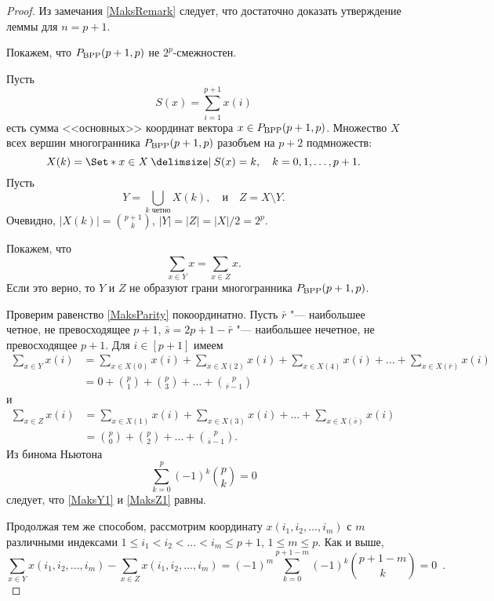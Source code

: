 \begin{proof}
Из замечания \ref{MaksRemark} следует, что достаточно доказать утверждение леммы для $n=p+1$.
	
Покажем, что $P_{\textup{BPP}}(p+1,p)$ не $2^p$-смежностен.
	
Пусть
$$
S(x) = \sum^{p+1}_{i = 1} x(i)
$$ 
есть сумма <<основных>> координат вектора $x\in P_{\textup{BPP}}(p+1,p)$.
Множество $X$ всех вершин многогранника $P_{\textup{BPP}}(p+1,p)$ разобъем на $p+2$ подмножеств:
$$
X(k) = \Set*{x\in X \given S(x) = k}, \quad k = 0,1,\ldots, p+1.
$$
Пусть
$$
Y = \bigcup_{\text{$k$ четно}} X(k), \quad \text{и} \quad
Z = X \setminus Y.
$$
Очевидно, $|X(k)| = \binom{p+1}{k}$, $|Y| = |Z| = |X|/2 = 2^p$.

Покажем, что
\begin{equation}
\label{MaksParity}
\sum_{x\in Y} x = \sum_{x\in Z} x.
\end{equation}
Если это верно, то $Y$ и $Z$ не образуют грани многогранника $P_{\textup{BPP}}(p+1,p)$.
	
Проверим равенство \eqref{MaksParity} покоординатно.
Пусть $\bar{r}$ "--- наибольшее четное, не превосходящее $p+1$, $\bar{s} = 2p+1 - \bar{r}$ "--- наибольшее нечетное, не превосходящее $p+1$.
Для $i \in [p+1]$ имеем
	\begin{equation}
	\label{MaksY1}
	\begin{aligned}
	\sum_{x\in Y} x(i) &= \sum_{x\in X(0)} x(i) + \sum_{x\in X(2)} x(i) + \sum_{x\in X(4)} x(i) + \ldots + \sum_{x\in X(\bar{r})} x(i) \\
	&= 0 + \binom{p}{1} + \binom{p}{3} + \ldots + \binom{p}{\bar{r}-1}
	\end{aligned}
	\end{equation}
	и
	\begin{equation}
	\label{MaksZ1}
	\begin{aligned}
	\sum_{x\in Z} x(i) &= \sum_{x\in X(1)} x(i) + \sum_{x\in X(3)} x(i) + \ldots + \sum_{x\in X(\bar{s})} x(i) \phantom{{} + \sum_{x\in X(0)} x(i)} \\
	&= \binom{p}{0} + \binom{p}{2} + \ldots + \binom{p}{\bar{s}-1}.
	\end{aligned}
	\end{equation}
	Из бинома Ньютона
	$$
	\sum^{p}_{k=0} (-1)^k \binom{p}{k} = 0
	$$
	следует, что \eqref{MaksY1} и \eqref{MaksZ1} равны.
	
	Продолжая тем же способом, рассмотрим координату $x(i_1, i_2, \ldots, i_m)$
	с $m$ различными индексами $1\le i_1 < i_2 < \ldots < i_m \le p+1$, $1\le m \le p$.
	Как и выше,
	\begin{equation*}
	\sum_{x\in Y} x(i_1, i_2, \ldots, i_m) - \sum_{x\in Z} x(i_1, i_2, \ldots, i_m) = (-1)^m \sum^{p+1-m}_{k=0} (-1)^k \binom{p+1-m}{k} = 0 \enspace .
	\end{equation*}
\end{proof}


